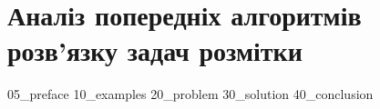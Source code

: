 \chapter{Аналіз попередніх алгоритмів розв'язку задач розмітки}
{05_preface}
{10_examples}
{20_problem}
{30_solution}
{40_conclusion}
